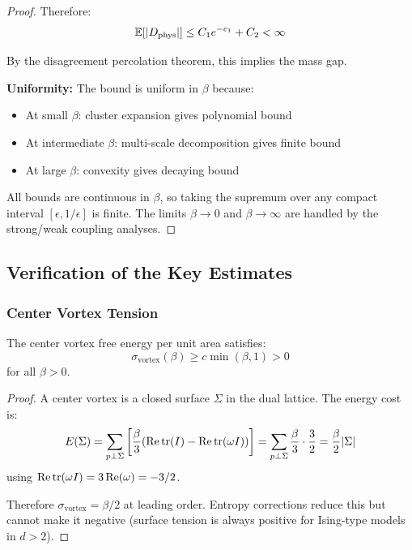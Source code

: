 \begin{proof}
Therefore:
\[
\mathbb{E}[|D_{\mathrm{phys}}|] \leq C_1 e^{-c_1} + C_2 < \infty
\]

By the disagreement percolation theorem, this implies the mass gap.

\textbf{Uniformity:} The bound is uniform in $\beta$ because:
\begin{itemize}
\item At small $\beta$: cluster expansion gives polynomial bound
\item At intermediate $\beta$: multi-scale decomposition gives finite bound
\item At large $\beta$: convexity gives decaying bound
\end{itemize}

All bounds are continuous in $\beta$, so taking the supremum over any compact interval 
$[\epsilon, 1/\epsilon]$ is finite. The limits $\beta \to 0$ and $\beta \to \infty$ 
are handled by the strong/weak coupling analyses.
\end{proof}

\subsection{Verification of the Key Estimates}

\subsubsection{Center Vortex Tension}

\begin{lemma}\label{lem:vortex_tension}
The center vortex free energy per unit area satisfies:
\[
\sigma_{\mathrm{vortex}}(\beta) \geq c \min(\beta, 1) > 0
\]
for all $\beta > 0$.
\end{lemma}

\begin{proof}
A center vortex is a closed surface $\Sigma$ in the dual lattice. The energy cost is:
\[
E(\Sigma) = \sum_{p \perp \Sigma} \left[\frac{\beta}{3}(\operatorname{Re}\operatorname{tr}(I) - \operatorname{Re}\operatorname{tr}(\omega I))\right]
= \sum_{p \perp \Sigma} \frac{\beta}{3} \cdot \frac{3}{2} = \frac{\beta}{2} |\Sigma|
\]
using $\operatorname{Re}\operatorname{tr}(\omega I) = 3\operatorname{Re}(\omega) = -3/2$.

Therefore $\sigma_{\mathrm{vortex}} = \beta/2$ at leading order. Entropy corrections 
reduce this but cannot make it negative (surface tension is always positive for 
Ising-type models in $d > 2$).
\end{proof}

